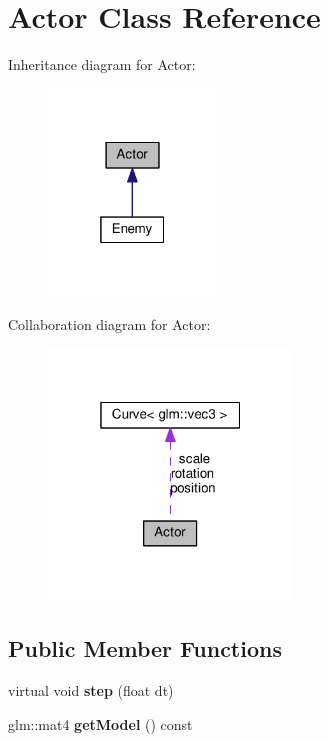 \hypertarget{class_actor}{}\section{Actor Class Reference}
\label{class_actor}


Inheritance diagram for Actor\+:\nopagebreak
\begin{figure}[H]
\begin{center}
\leavevmode
\includegraphics[width=127pt]{class_actor__inherit__graph}
\end{center}
\end{figure}


Collaboration diagram for Actor\+:\nopagebreak
\begin{figure}[H]
\begin{center}
\leavevmode
\includegraphics[width=184pt]{class_actor__coll__graph}
\end{center}
\end{figure}
\subsection*{Public Member Functions}
\begin{DoxyCompactItemize}
\item 
\hypertarget{class_actor_aca81671d1a816725523bf45e03167858}{}virtual void {\bfseries step} (float dt)\label{class_actor_aca81671d1a816725523bf45e03167858}

\item 
\hypertarget{class_actor_a77d4385e6144f842dd40b213e27d8aa1}{}glm\+::mat4 {\bfseries get\+Model} () const \label{class_actor_a77d4385e6144f842dd40b213e27d8aa1}

\end{DoxyCompactItemize}

